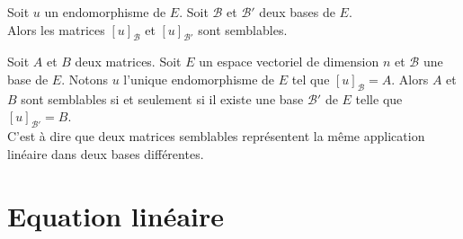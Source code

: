 \documentclass{book}
\begin{document}
\begin{Proposition}
Soit $u$ un endomorphisme de $E$. Soit $\mathcal{B}$ et $\mathcal{B}'$ deux bases de $E$.\\
Alors les matrices $[u]_\mathcal{B}$ et $[u]_{\mathcal{B}'}$ sont semblables.
\end{Proposition}
\begin{Proposition}
Soit $A$ et $B$ deux matrices.
Soit $E$ un espace vectoriel de dimension $n$ et $\mathcal{B}$ une base de $E$.
Notons $u$ l'unique endomorphisme de $E$ tel que $[u]_\mathcal{B} = A$.
Alors $A$ et $B$ sont semblables si et seulement si il existe une base $\mathcal{B}'$ de $E$ telle que $[u]_{\mathcal{B}'} = B$.\\
C'est à dire que deux matrices semblables représentent la même application linéaire dans deux bases différentes.
\end{Proposition}

\section{Equation linéaire}
%
%
%
%
%
%
%
%
%
%
%
%
%
%
%
%
%
%
%
%
%
%
%
\end{document}
